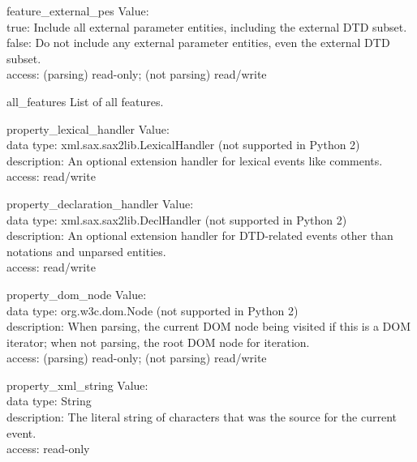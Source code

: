 \begin{datadesc}{feature_external_pes}
  Value: \\
  true: Include all external parameter entities, including the external
        DTD subset.\\
  false: Do not include any external parameter entities, even the external
         DTD subset.\\
  access: (parsing) read-only; (not parsing) read/write
\end{datadesc}

\begin{datadesc}{all_features}
  List of all features.
\end{datadesc}

\begin{datadesc}{property_lexical_handler}
  Value: \\
  data type: xml.sax.sax2lib.LexicalHandler (not supported in Python 2)\\
  description: An optional extension handler for lexical events like comments.\\
  access: read/write
\end{datadesc}

\begin{datadesc}{property_declaration_handler}
  Value: \\
  data type: xml.sax.sax2lib.DeclHandler (not supported in Python 2)\\
  description: An optional extension handler for DTD-related events other
               than notations and unparsed entities.\\
  access: read/write
\end{datadesc}

\begin{datadesc}{property_dom_node}
  Value: \\
  data type: org.w3c.dom.Node (not supported in Python 2) \\
  description: When parsing, the current DOM node being visited if this is
               a DOM iterator; when not parsing, the root DOM node for
               iteration.\\
  access: (parsing) read-only; (not parsing) read/write  
\end{datadesc}

\begin{datadesc}{property_xml_string}
  Value: \\
  data type: String\\
  description: The literal string of characters that was the source for
               the current event.\\
  access: read-only
\end{datadesc}

